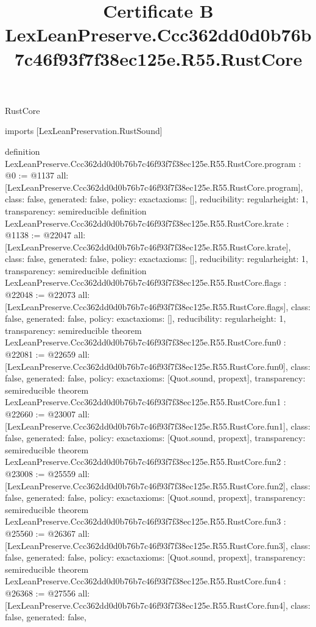 \begin{lexlean}{RustCore}
\title{Certificate B LexLeanPreserve.Ccc362dd0d0b76b7c46f93f7f38ec125e.R55.RustCore}
\begin{coremodule}
imports [LexLeanPreservation.RustSound]

definition LexLeanPreserve.Ccc362dd0d0b76b7c46f93f7f38ec125e.R55.RustCore.program : @0 := @1137 {
  all: [LexLeanPreserve.Ccc362dd0d0b76b7c46f93f7f38ec125e.R55.RustCore.program],
  class: false,
  generated: false,
  policy: exact{axioms: []},
  reducibility: regular{height: 1},
  transparency: semireducible
}
definition LexLeanPreserve.Ccc362dd0d0b76b7c46f93f7f38ec125e.R55.RustCore.krate : @1138 := @22047 {
  all: [LexLeanPreserve.Ccc362dd0d0b76b7c46f93f7f38ec125e.R55.RustCore.krate],
  class: false,
  generated: false,
  policy: exact{axioms: []},
  reducibility: regular{height: 1},
  transparency: semireducible
}
definition LexLeanPreserve.Ccc362dd0d0b76b7c46f93f7f38ec125e.R55.RustCore.flags : @22048 := @22073 {
  all: [LexLeanPreserve.Ccc362dd0d0b76b7c46f93f7f38ec125e.R55.RustCore.flags],
  class: false,
  generated: false,
  policy: exact{axioms: []},
  reducibility: regular{height: 1},
  transparency: semireducible
}
theorem LexLeanPreserve.Ccc362dd0d0b76b7c46f93f7f38ec125e.R55.RustCore.fun0 : @22081 := @22659 {
  all: [LexLeanPreserve.Ccc362dd0d0b76b7c46f93f7f38ec125e.R55.RustCore.fun0],
  class: false,
  generated: false,
  policy: exact{axioms: [Quot.sound, propext]},
  transparency: semireducible
}
theorem LexLeanPreserve.Ccc362dd0d0b76b7c46f93f7f38ec125e.R55.RustCore.fun1 : @22660 := @23007 {
  all: [LexLeanPreserve.Ccc362dd0d0b76b7c46f93f7f38ec125e.R55.RustCore.fun1],
  class: false,
  generated: false,
  policy: exact{axioms: [Quot.sound, propext]},
  transparency: semireducible
}
theorem LexLeanPreserve.Ccc362dd0d0b76b7c46f93f7f38ec125e.R55.RustCore.fun2 : @23008 := @25559 {
  all: [LexLeanPreserve.Ccc362dd0d0b76b7c46f93f7f38ec125e.R55.RustCore.fun2],
  class: false,
  generated: false,
  policy: exact{axioms: [Quot.sound, propext]},
  transparency: semireducible
}
theorem LexLeanPreserve.Ccc362dd0d0b76b7c46f93f7f38ec125e.R55.RustCore.fun3 : @25560 := @26367 {
  all: [LexLeanPreserve.Ccc362dd0d0b76b7c46f93f7f38ec125e.R55.RustCore.fun3],
  class: false,
  generated: false,
  policy: exact{axioms: [Quot.sound, propext]},
  transparency: semireducible
}
theorem LexLeanPreserve.Ccc362dd0d0b76b7c46f93f7f38ec125e.R55.RustCore.fun4 : @26368 := @27556 {
  all: [LexLeanPreserve.Ccc362dd0d0b76b7c46f93f7f38ec125e.R55.RustCore.fun4],
  class: false,
  generated: false,
}
\end{coremodule}
\end{lexlean}
